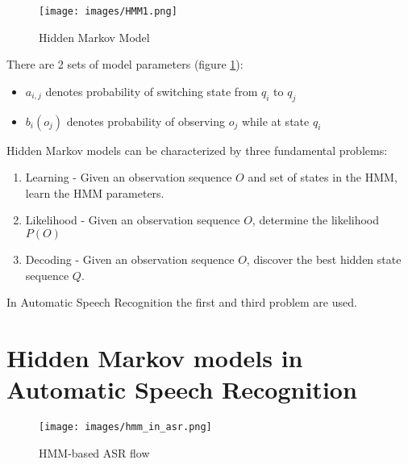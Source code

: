 \documentclass[a4paper,11pt,twoside]{report}
\theoremstyle{definition}
\begin{document}
\begin{figure}[H]{}
    \centering
    \texttt{[image: images/HMM1.png]}
    \caption{Hidden Markov Model}
    \label{img:HiddenMarkovModel}
\end{figure}

\noindent There are 2 sets of model parameters (figure \ref{img:HiddenMarkovModel}):
\vspace{-5mm}
\begin{itemize}
    \setlength\itemsep{-0.5em}
    \item $a_{i,j}$ denotes probability of switching state from $q_i$ to $q_j$
    \item $b_i(o_j)$ denotes probability of observing $o_j$ while at state $q_i$
\end{itemize}

\noindent Hidden Markov models can be characterized by three fundamental problems:
\vspace{-5mm}
\begin{enumerate}
    \setlength\itemsep{-0.5em}
    \item Learning - Given an observation sequence $O$ and set of states in the HMM, learn the HMM parameters.
    \item Likelihood - Given an observation sequence $O$, determine the likelihood $P(O)$
    \item Decoding - Given an observation sequence $O$, discover the best hidden state sequence $Q$.
\end{enumerate}

\noindent In Automatic Speech Recognition the first and third problem are used.

\section{Hidden Markov models in Automatic Speech Recognition}

\begin{figure}[H]{}
    \centering
    \texttt{[image: images/hmm\_in\_asr.png]}
    \caption{HMM-based ASR flow}
    \label{img:HiddenMarkovModelInASR}
\end{figure}
\end{document}

